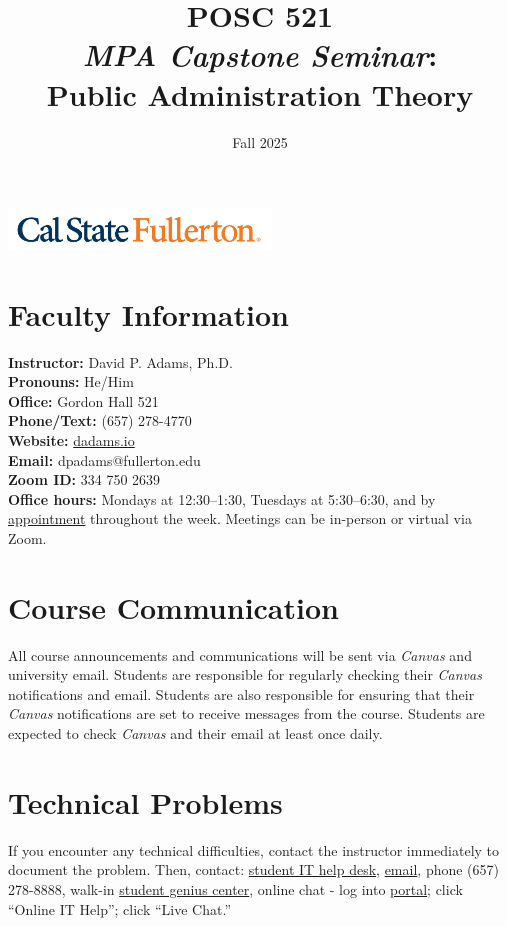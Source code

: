 \documentclass[12pt]{article}     %
\title{\textbf{\Huge{POSC 521}} \\ \textit{MPA Capstone Seminar}: \\
Public Administration Theory} %
\author{}                         %
\date{\Large{Fall 2025}}              %
\begin{document}
\maketitle

\begin{center}
    \includegraphics[width=2.75in, alt={Cal State Fullerton wordmark}]{csuf_logo.png}
\end{center}


\section{Faculty Information}
\noindent \textbf{Instructor:} David P. Adams, Ph.D. \\
\noindent \textbf{Pronouns:} He/Him \\
\noindent \textbf{Office:} Gordon Hall 521 \\
\noindent \textbf{Phone/Text:} (657) 278-4770 \\
\noindent \textbf{Website:} \href{https://dadams.io}{dadams.io} \\
\noindent \textbf{Email:} dpadams@fullerton.edu \\
\noindent \textbf{Zoom ID:} 334 750 2639 \\
\noindent \textbf{Office hours:} Mondays at 12:30--1:30, Tuesdays at 5:30--6:30, and by \href{https://dadams.io/appointments}{appointment} throughout the week. Meetings can be in-person or virtual via Zoom.

\section{Course Communication}
All course announcements and communications will be sent via \emph{Canvas} and university email. Students are responsible for regularly checking their \emph{Canvas} notifications and email. Students are also responsible for ensuring that their \emph{Canvas} notifications are set to receive messages from the course. Students are expected to check \emph{Canvas} and their email at least once daily.

\section{Technical Problems}
If you encounter any technical difficulties, contact the instructor immediately to document the problem. Then, contact: \href{http://www.fullerton.edu/it/students/helpdesk/index.php}{student IT help desk}, \href{mailto:StudentITHelpDesk@fullerton.edu}{email}, phone (657) 278-8888, walk-in \href{http://www.fullerton.edu/it/students/sgc/index.php}{student genius center}, online chat - log into \href{http://my.fullerton.edu}{portal}; click ``Online IT Help''; click ``Live Chat.''
\end{document}
